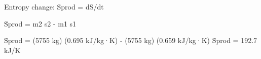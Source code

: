 Entropy change:  
Ṡprod = dS/dt  

Ṡprod = m2 s2 - m1 s1  

Ṡprod = (5755 kg) (0.695 kJ/kg·K) - (5755 kg) (0.659 kJ/kg·K)  
Ṡprod = 192.7 kJ/K